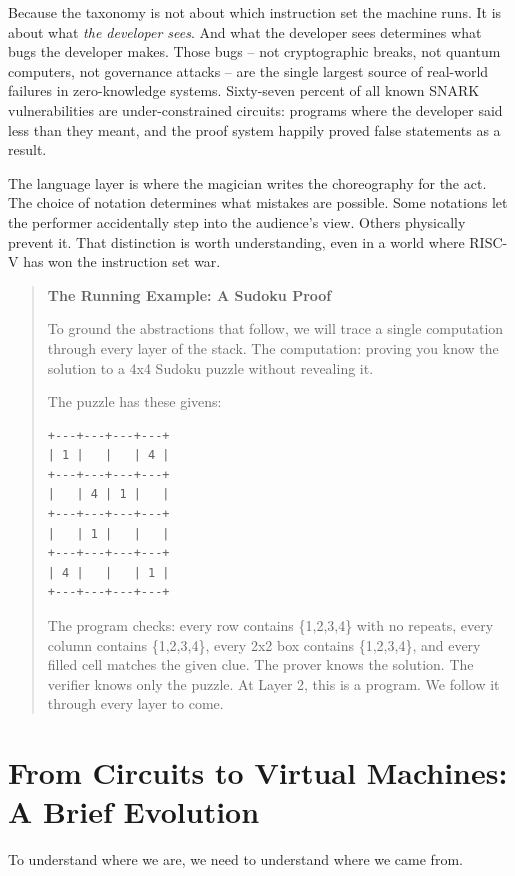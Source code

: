 \documentclass[
  11pt,
  openany]{report}
\renewcommand{\textbf}[1]{{\bfseries\color{MidnightBold}#1}}
\begin{document}
Because the taxonomy is not about which instruction set the machine runs. It is
about what \emph{the developer sees}. And what the developer sees determines
what bugs the developer makes. Those bugs -- not cryptographic breaks, not
quantum computers, not governance attacks -- are the single largest source of
real-world failures in zero-knowledge systems. Sixty-seven percent of all known
SNARK vulnerabilities are under-constrained circuits: programs where the
developer said less than they meant, and the proof system happily proved false
statements as a result.

The language layer is where the magician writes the choreography for the act.
The choice of notation determines what mistakes are possible. Some notations let
the performer accidentally step into the audience's view. Others physically
prevent it. That distinction is worth understanding, even in a world where
RISC-V has won the instruction set war.

\begin{quote}
\textbf{The Running Example: A Sudoku Proof}

To ground the abstractions that follow, we will trace a single computation
through every layer of the stack. The computation: proving you know the solution
to a 4x4 Sudoku puzzle without revealing it.

The puzzle has these givens:

\begin{verbatim}
+---+---+---+---+
| 1 |   |   | 4 |
+---+---+---+---+
|   | 4 | 1 |   |
+---+---+---+---+
|   | 1 |   |   |
+---+---+---+---+
| 4 |   |   | 1 |
+---+---+---+---+
\end{verbatim}

The program checks: every row contains \{1,2,3,4\} with no repeats, every column
contains \{1,2,3,4\}, every 2x2 box contains \{1,2,3,4\}, and every filled cell
matches the given clue. The prover knows the solution. The verifier knows only
the puzzle. At Layer 2, this is a program. We follow it through every layer to
come.
\end{quote}

\section{From Circuits to Virtual Machines: A Brief
Evolution}\label{from-circuits-to-virtual-machines-a-brief-evolution}

To understand where we are, we need to understand where we came from.
\end{document}
